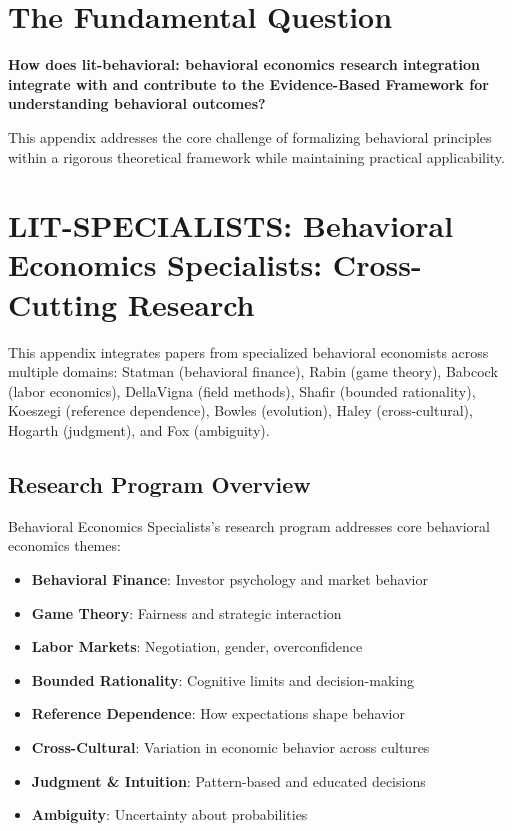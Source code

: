 \section{The Fundamental Question}
\label{sec:spc-fundamental}

\begin{tcolorbox}[
    colback=red!5!white,
    colframe=red!75!black,
    title={\textbf{Fundamental Question}}
]
\textbf{How does lit-behavioral: behavioral economics research integration integrate with and contribute to the
Evidence-Based Framework for understanding behavioral outcomes?}

This appendix addresses the core challenge of formalizing behavioral principles
within a rigorous theoretical framework while maintaining practical applicability.
\end{tcolorbox}




\section{LIT-SPECIALISTS: Behavioral Economics Specialists: Cross-Cutting Research}
\label{app:litad}

This appendix integrates papers from specialized behavioral economists
across multiple domains: Statman (behavioral finance), Rabin (game theory), Babcock
(labor economics), DellaVigna (field methods), Shafir (bounded rationality), Koeszegi
(reference dependence), Bowles (evolution), Haley (cross-cultural), Hogarth (judgment),
and Fox (ambiguity).

\subsection{Research Program Overview}

Behavioral Economics Specialists's research program addresses core behavioral economics themes:

\begin{itemize}
  \item \textbf{Behavioral Finance}: Investor psychology and market behavior
  \item \textbf{Game Theory}: Fairness and strategic interaction
  \item \textbf{Labor Markets}: Negotiation, gender, overconfidence
  \item \textbf{Bounded Rationality}: Cognitive limits and decision-making
  \item \textbf{Reference Dependence}: How expectations shape behavior
  \item \textbf{Cross-Cultural}: Variation in economic behavior across cultures
  \item \textbf{Judgment & Intuition}: Pattern-based and educated decisions
  \item \textbf{Ambiguity}: Uncertainty about probabilities
\end{itemize}

